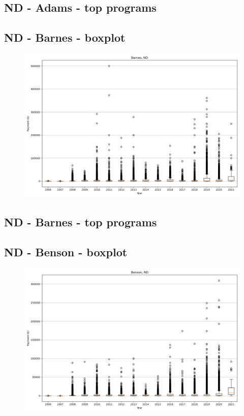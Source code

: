 \subsection*{ND - Adams - top programs}

\newpage
\subsection*{ND - Barnes - boxplot}
\begin{figure}[h]
\centering
\includegraphics[width=7in]{../output/boxplots/counties/Barnes-ND_boxplot.png}
\end{figure}


\subsection*{ND - Barnes - top programs}

\newpage
\subsection*{ND - Benson - boxplot}
\begin{figure}[h]
\centering
\includegraphics[width=7in]{../output/boxplots/counties/Benson-ND_boxplot.png}
\end{figure}


